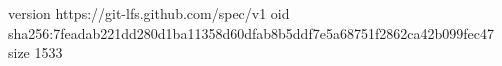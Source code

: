 version https://git-lfs.github.com/spec/v1
oid sha256:7feadab221dd280d1ba11358d60dfab8b5ddf7e5a68751f2862ca42b099fec47
size 1533
